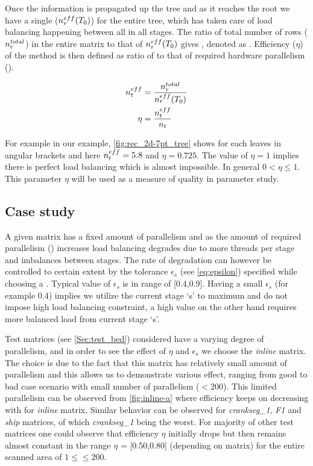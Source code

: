 Once the information is propagated up the tree and as it reaches the root we have a single \effRow ($n_{r}^{eff}(T_0)$) for the entire tree, which has taken care of load balancing happening between all \levelGroups in all stages. The ratio of total number of rows ($n_{r}^{total}$) in the entire matrix to that of $n_{r}^{eff}(T_0)$ gives \effPar, denoted as \threadEff. Efficiency ($\eta$) of the method is then defined as ratio of  \threadEff to that of required hardware parallelism (\nthreads). 

\begin{align}
	\threadEffMath &= \frac{\nrowsMath^{total}}{\nrowsEffMath(T_0)} \\
	\eta &= \frac{\threadEffMath}{\nthreadsMath} \label{eq:eta}
\end{align}

For example in our \STEX example, \cref{fig:rec_2d-7pt_tree} shows \nrowsEff for each leaves in angular brackets and here $n_{t}^{eff} = 5.8$ and $\eta = 0.725$. The value of $\eta = 1$ implies there is perfect load balancing which is almost impossible. In general $0 < \eta \leq 1$. This parameter $\eta$ will be used as a measure of quality in parameter study.

\subsection{Case study}
A given matrix has a fixed amount of parallelism and as the amount of required parallelism (\nthreads) increases load balancing degrades due to more threads per stage and imbalances between stages. The rate of degradation can however be controlled to certain extent by the tolerance $\epsilon_s$ (see \cref{eq:epsilon}) specified while choosing a \levelGroup. Typical value of $\epsilon_s$ is in range of [0.4,0.9]. Having a small $\epsilon_s$ (for example 0.4) implies we utilize the current stage `s' to maximum and do not impose high load balancing constraint, a high value on the other hand requires more balanced load from current stage `s'. 

Test matrices (see \cref{Sec:test_bed}) considered have a varying degree of parallelism, and in order to see the effect of $\eta$ and $\epsilon_s$ we choose the \emph{inline} matrix. The choice is due to the fact that this matrix has relatively small amount of parallelism and this allows us to demonstrate various effect, ranging from good to bad case scenario with small number of parallelism (\nthreads$ < 200$). This limited parallelism can be observed from \cref{fig:inline-a} 
where efficiency keeps on decreasing with \nthreads for \emph{inline} matrix. Similar behavior can be observed for \emph{crankseg\_1}, \emph{F1} and \emph{ship} matrices, of which \emph{crankseg\_1} being the worst. For majority of other test matrices one could observe that efficiency $\eta$ initially drops but then remains almost constant in the range $\eta$ = [0.50,0.80] (depending on matrix) for the entire scanned area of $1 \leq $\nthreads$ \leq 200$.

